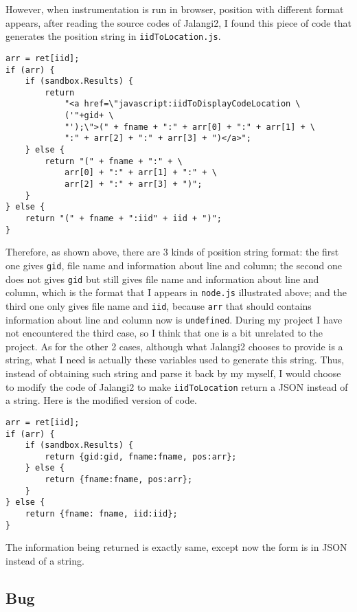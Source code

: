 However, when instrumentation is run in browser, position with different format appears, after reading the source codes of Jalangi2, I found this piece of code that generates the position string in \texttt{iidToLocation.js}.

\begin{verbatim}
arr = ret[iid];
if (arr) {
    if (sandbox.Results) {
        return
            "<a href=\"javascript:iidToDisplayCodeLocation \
            ('"+gid+ \
            "');\">(" + fname + ":" + arr[0] + ":" + arr[1] + \
            ":" + arr[2] + ":" + arr[3] + ")</a>";
    } else {
        return "(" + fname + ":" + \
            arr[0] + ":" + arr[1] + ":" + \
            arr[2] + ":" + arr[3] + ")";
    }
} else {
    return "(" + fname + ":iid" + iid + ")";
}
\end{verbatim}


Therefore, as shown above, there are 3 kinds of position string format: the first one gives \texttt{gid}, file name and information about line and column; the second one does not gives \texttt{gid} but still gives file name and information about line and column, which is the format that I appears in \texttt{node.js} illustrated above; and the third one only gives file name and \texttt{iid}, because \texttt{arr} that should contains information about line and column now is \texttt{undefined}. During my project I have not encountered the third case, so I think that one is a bit unrelated to the project. As for the other 2 cases, although what Jalangi2 chooses to provide is a string, what I need is actually these variables used to generate this string. Thus, instead of obtaining such string and parse it back by my myself, I would choose to modify the code of Jalangi2 to make \texttt{iidToLocation} return a JSON instead of a string. Here is the modified version of code.

\begin{verbatim}
arr = ret[iid];
if (arr) {
    if (sandbox.Results) {
        return {gid:gid, fname:fname, pos:arr};
    } else {
        return {fname:fname, pos:arr};
    }
} else {
    return {fname: fname, iid:iid};
}
\end{verbatim}


The information being returned is exactly same, except now the form is in JSON instead of a string.

\subsection{Bug}

